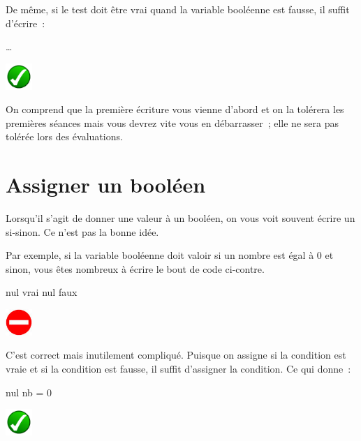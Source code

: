 	\bigskip
	\begin{minipage}{9cm}
		De même, si le test doit être vrai quand la variable booléenne
		est fausse, il suffit d’écrire~: 
	\end{minipage}
	\quad
	\begin{minipage}{4cm}	
		\begin{LDA}
			\Stmt \dots
		\EndIf
		\end{LDA}
	\end{minipage}
	\hskip-5mm
	\includegraphics[width=1cm]{icon/do}

	\bigskip
	On comprend que la première écriture vous vienne
	d’abord et on la tolérera les premières séances
	mais vous devrez vite vous en débarrasser~;
	elle ne sera pas tolérée lors des évaluations.
	
\section{Assigner un booléen}\label{B-ass-bool}

	Lorsqu’il s’agit de donner une valeur à un booléen,
	on vous voit souvent écrire un si-sinon.
	Ce n’est pas la bonne idée.

	\bigskip
	\begin{minipage}{9cm}
		Par exemple,
		si la variable booléenne \lda{nul} 
		doit valoir  si un nombre est égal à 0
		et  sinon,
		vous êtes nombreux à écrire le bout de code ci-contre.		
	\end{minipage}
	\quad
	\begin{minipage}{4cm}
		\begin{LDA}
		\If{nb = 0}
			\Let nul \Gets vrai
		\Else
			\Let nul \Gets faux
		\EndIf
		\end{LDA}
	\end{minipage}
	\hskip-5mm
	\includegraphics[width=1cm]{icon/dont}

	\bigskip
	\begin{minipage}{9cm}
		C’est correct mais inutilement compliqué.
		Puisque on assigne  si la condition
		est vraie et  si la condition est
		fausse, il suffit d’assigner la condition.
		Ce qui donne~:
	\end{minipage}
	\quad
	\begin{minipage}{4cm}
		\begin{LDA}
		\Let nul \Gets nb = 0
		\end{LDA}
	\end{minipage}
	\hskip-5mm
	\includegraphics[width=1cm]{icon/do}

